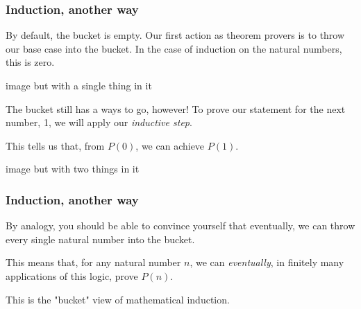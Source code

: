 \documentclass[aspectratio=169]{beamer}
\begin{document}
\begin{frame}[fragile]
  \frametitle{Induction, another way}

  By default, the bucket is empty. Our first action as theorem provers is to throw our base case
  into the bucket. In the case of induction on the natural numbers, this is zero.

  \vspace{\fill}
  
  image but with a single thing in it

  \vspace{\fill}

  The bucket still has a ways to go, however! To prove our statement for the next number, 1, we
  will apply our \textit{inductive step}. 

  \vspace{\fill}

  This tells us that, from $P(0)$, we can achieve $P(1)$.

  \vspace{\fill}

  image but with two things in it
\end{frame}

\begin{frame}[fragile]
  \frametitle{Induction, another way}

  By analogy, you should be able to convince yourself that eventually, we can throw every single
  natural number into the bucket.

  \vspace{\fill}

  This means that, for any natural number $n$, we can \textit{eventually}, in finitely many
  applications of this logic, prove $P(n)$.

  \vspace{\fill}

  This is the "bucket" view of mathematical induction.
\end{frame}
\end{document}
